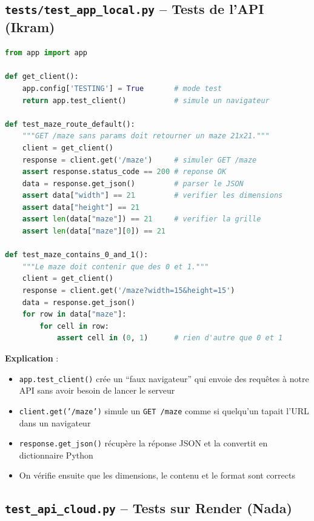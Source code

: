 \documentclass[12pt,a4paper]{article}
\begin{document}
\subsection{\texttt{tests/test\_app\_local.py} -- Tests de l'API (Ikram)}

\begin{lstlisting}[language=Python, caption={Test de l'API avec le client de test Flask}]
from app import app

def get_client():
    app.config['TESTING'] = True       # mode test
    return app.test_client()           # simule un navigateur

def test_maze_route_default():
    """GET /maze sans params doit retourner un maze 21x21."""
    client = get_client()
    response = client.get('/maze')     # simuler GET /maze
    assert response.status_code == 200 # reponse OK
    data = response.get_json()         # parser le JSON
    assert data["width"] == 21         # verifier les dimensions
    assert data["height"] == 21
    assert len(data["maze"]) == 21     # verifier la grille
    assert len(data["maze"][0]) == 21

def test_maze_contains_0_and_1():
    """Le maze doit contenir que des 0 et 1."""
    client = get_client()
    response = client.get('/maze?width=15&height=15')
    data = response.get_json()
    for row in data["maze"]:
        for cell in row:
            assert cell in (0, 1)      # rien d'autre que 0 et 1
\end{lstlisting}

\textbf{Explication} :
\begin{itemize}
    \item \texttt{app.test\_client()} crée un ``faux navigateur'' qui envoie des requêtes à notre API sans avoir besoin de lancer le serveur
    \item \texttt{client.get('/maze')} simule un \texttt{GET /maze} comme si quelqu'un tapait l'URL dans un navigateur
    \item \texttt{response.get\_json()} récupère la réponse JSON et la convertit en dictionnaire Python
    \item On vérifie ensuite que les dimensions, le contenu et le format sont corrects
\end{itemize}

\subsection{\texttt{test\_api\_cloud.py} -- Tests sur Render (Nada)}
\end{document}
